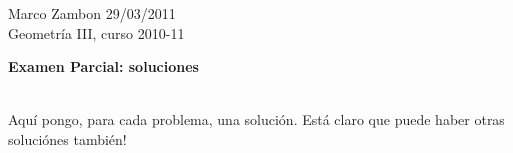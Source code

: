 \documentclass[12pt,a4paper]{report}
\theoremstyle{definition}
\begin{document}
\noindent
{\sffamily\large Marco Zambon 
\hfill     29/03/2011\\Geometr\'ia III, curso 2010-11}
 

\begin{center}\bfseries\large\textsf{Examen Parcial: soluciones    \vspace{-2mm}}
\end{center}

 

 \noindent
\hrulefill{}\\
\textsf{Aqu\'i pongo, para cada problema, una soluci\'on. Est\'a claro que puede haber otras soluci\'ones tambi\'en! \vspace{-2mm}}

\noindent
\hrulefill{}\\
\end{document}
